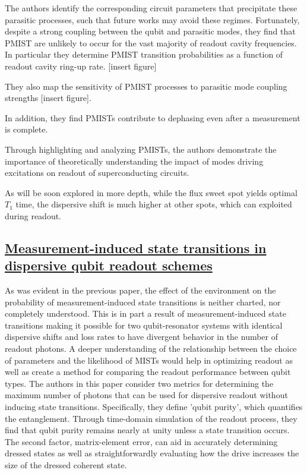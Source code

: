 \documentclass[
 reprint,
 superscriptaddress,
 bibnotes,
 amsmath,
 amssymb,
 aps,
 prb,
 citeautoscript,
 floatfix,
]{revtex4-2}
\begin{document}
The authors identify the corresponding circuit parameters that precipitate these parasitic processes, such that future works may avoid these regimes. Fortunately, despite a strong coupling between the qubit and parasitic modes, they find that PMIST are unlikely to occur for the vast majority of readout cavity frequencies. In particular they determine PMIST transition probabilities as a function of readout cavity ring-up rate. [insert figure]

They also map the sensitivity of PMIST processes to parasitic mode coupling strengths [insert figure].


In addition, they find PMISTs contribute to dephasing even after a measurement is complete.  

Through highlighting and analyzing PMISTs, the authors demonstrate the importance of theoretically understanding the impact of modes driving excitations on readout of superconducting circuits. 

As will be soon explored in more depth, while the flux sweet spot yields optimal $T_1$ time, the dispersive shift is much higher at other spots, which can exploited during readout.

\subsection{\href{https://arxiv.org/abs/2402.07360}{Measurement-induced state transitions in dispersive qubit readout schemes}}

As was evident in the previous paper, the effect of the environment on the probability of measurement-induced state transitions is neither charted, nor completely understood. This is in part a result of measurement-induced state transitions making it possible for two qubit-resonator systems with identical dispersive shifts and loss rates to have divergent behavior in the number of readout photons.  A deeper understanding of the relationship between the choice of parameters and the likelihood of MISTs would help in optimizing readout as well as create a method for comparing the readout performance between qubit types. The authors in this paper consider two metrics for determining the maximum number of photons that can be used for dispersive readout without inducing state transitions. Specifically, they define 'qubit purity', which quantifies the entanglement. Through time-domain simulation of the readout process, they find that qubit purity remains
nearly at unity unless a state transition occurs. The second factor, matrix-element error, can aid in accurately determining dressed states as well as straightforwardly evaluating how the drive increases the size of the dressed coherent state. 
\end{document}
